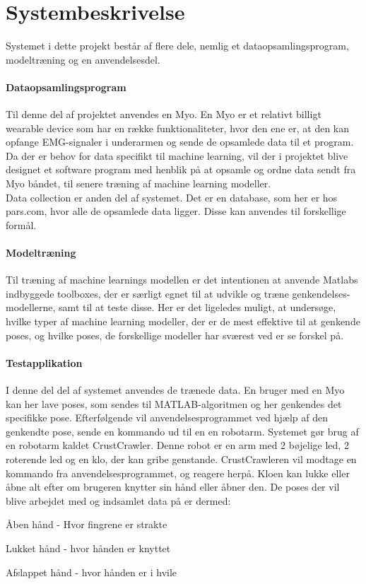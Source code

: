 \thispagestyle{fancy}
\chapter{Systembeskrivelse}
\label{chp:systembeskrivelse}

Systemet i dette projekt består af flere dele, nemlig et dataopsamlingsprogram, modeltræning og en anvendelsesdel.
\subsubsection{Dataopsamlingsprogram}
Til denne del af projektet anvendes en Myo. En Myo er et relativt billigt wearable device som har en række funktionaliteter, hvor den ene er, at den kan opfange EMG-signaler i underarmen og sende de opsamlede data til et program.\\
Da der er behov for data specifikt til machine learning, vil der i projektet blive designet et software program med henblik på at opsamle og ordne data sendt fra Myo båndet, til senere træning af machine learning modeller.\\
Data collection er anden del af systemet. Det er en database, som her er hos pars.com, hvor alle de opsamlede data ligger. Disse kan anvendes til forskellige formål.

\subsubsection{Modeltræning}
Til træning af machine learnings modellen er det intentionen at anvende Matlabs indbyggede toolboxes, der er særligt egnet til at udvikle og træne genkendelses-modellerne, samt til at teste disse. 
Her er det ligeledes muligt, at undersøge, hvilke typer af machine learning modeller, der er de mest effektive til at genkende poses, og hvilke poses, de forskellige modeller har sværest ved er se forskel på.

\subsubsection{Testapplikation}
I denne del del af systemet anvendes de trænede data. En bruger med en Myo kan her lave poses, som sendes til MATLAB-algoritmen og her genkendes det specifikke pose. Efterfølgende vil anvendelsesprogrammet ved hjælp af den genkendte pose, sende en kommando ud til en en robotarm. Systemet gør brug af en robotarm kaldet CrustCrawler. Denne robot er en arm med 2 bøjelige led, 2 roterende led og en klo, der kan gribe genstande. CrustCrawleren vil modtage en kommando fra anvendelsesprogrammet, og reagere herpå. Kloen kan lukke eller åbne alt efter om brugeren knytter sin hånd eller åbner den. De poses der vil blive arbejdet med og indsamlet data på er dermed:
\begin{myItemize}
	\item Åben hånd - Hvor fingrene er strakte
	\item Lukket hånd - hvor hånden er knyttet
	\item Afslappet hånd - hvor hånden er i hvile
\end{myItemize}


